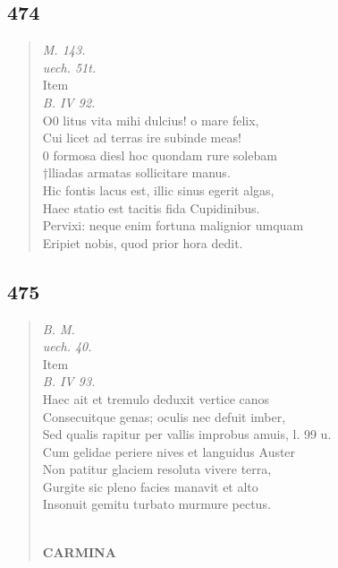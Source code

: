 \documentclass[11pt, a4paper]{report}
\begin{document}
            \subsection*{474}
      \begin{verse}
      \textit{M. 143.} \\ \textit{uech. 51t.} \\ Item \\ \textit{B. IV 92.} \\ O0 litus vita mihi dulcius! o mare felix, \\ Cui licet ad terras ire subinde meas! \\ 0 formosa diesl hoc quondam rure solebam \\ †lliadas armatas sollicitare manus. \\ Hic fontis lacus est, illic sinus egerit algas, \\ Haec statio est tacitis fida Cupidinibus. \\ Pervixi: neque enim fortuna malignior umquam \\ Eripiet nobis, quod prior hora dedit. \\ 
      \end{verse}
  
            \subsection*{475}
      \begin{verse}
      \textit{B. M.} \\ \textit{uech. 40.} \\ Item \\ \textit{B. IV 93.} \\ Haec ait et tremulo deduxit vertice canos \\ Consecuitque genas; oculis nec defuit imber, \\ Sed qualis rapitur per vallis improbus amuis, l. 99 u. \\ Cum gelidae periere nives et languidus Auster \\ Non patitur glaciem resoluta vivere terra, \\ Gurgite sic pleno facies manavit et alto \\ Insonuit gemitu turbato murmure pectus. \\ 
        ﻿\pagebreak 
    \begin{center} \textbf{CARMINA} \end{center} \marginpar{[348]} 
      \end{verse}
  
\end{document}
